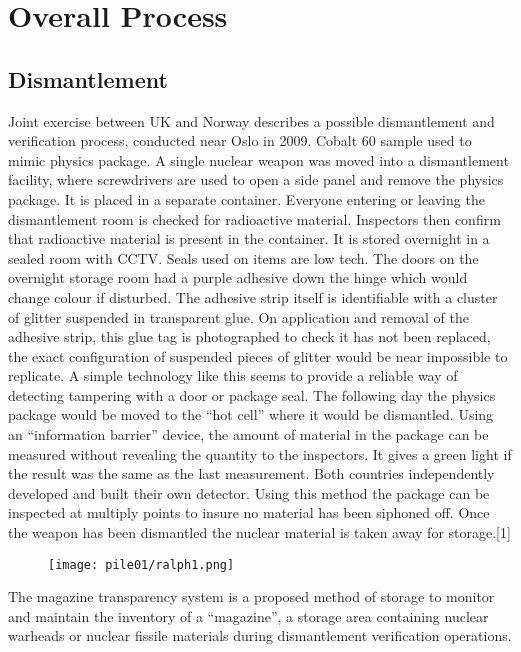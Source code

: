 \documentclass[twocolumn,a4paper]{article}
\begin{document}
\section{Overall Process}
\subsection{Dismantlement}
Joint exercise between UK and Norway describes a possible
dismantlement and verification process, conducted near Oslo in
2009. Cobalt 60 sample used to mimic physics package. A single nuclear
weapon was moved into a dismantlement facility, where screwdrivers are
used to open a side panel and remove the physics package. It is placed
in a separate container. Everyone entering or leaving the
dismantlement room is checked for radioactive material. Inspectors
then confirm that radioactive material is present in the container. It
is stored overnight in a sealed room with CCTV. Seals used on items
are low tech. The doors on the overnight storage room had a purple
adhesive down the hinge which would change colour if disturbed. The
adhesive strip itself is identifiable with a cluster of glitter
suspended in transparent glue. On application and removal of the
adhesive strip, this glue tag is photographed to check it has not been
replaced, the exact configuration of suspended pieces of glitter would
be near impossible to replicate. A simple technology like this seems
to provide a reliable way of detecting tampering with a door or
package seal. The following day the physics package would be moved to
the ``hot cell'' where it would be dismantled.  Using an ``information
barrier'' device, the amount of material in the package can be
measured without revealing the quantity to the inspectors. It gives a
green light if the result was the same as the last measurement. Both
countries independently developed and built their own detector. Using
this method the package can be inspected at multiply points to insure
no material has been siphoned off. Once the weapon has been dismantled
the nuclear material is taken away for storage.[1]

\begin{figure}
  \texttt{[image: pile01/ralph1.png]}
\end{figure}

The magazine transparency system is a proposed method of storage to
monitor and maintain the inventory of a ``magazine'', a storage area
containing nuclear warheads or nuclear fissile materials during
dismantlement verification operations.
\end{document}
